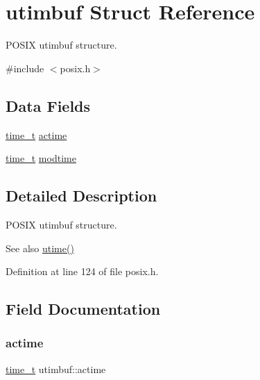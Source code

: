 \hypertarget{structutimbuf}{}\section{utimbuf Struct Reference}
\label{structutimbuf}


P\+O\+S\+IX utimbuf structure.  




{\ttfamily \#include $<$posix.\+h$>$}

\subsection*{Data Fields}
\begin{DoxyCompactItemize}
\item 
\hyperlink{time_8h_a3346b04b0420b32ccf6b706551b70762}{time\+\_\+t} \hyperlink{structutimbuf_aa39cf0bad7eff4df6239528506a557df}{actime}
\item 
\hyperlink{time_8h_a3346b04b0420b32ccf6b706551b70762}{time\+\_\+t} \hyperlink{structutimbuf_a7588ffe699a9eda52e94aa593bf7d6d8}{modtime}
\end{DoxyCompactItemize}


\subsection{Detailed Description}
P\+O\+S\+IX utimbuf structure. 

\begin{DoxySeeAlso}{See also}
\hyperlink{posix_8c_a732642e09075838bbbca28b3529f13db}{utime()} 
\end{DoxySeeAlso}


Definition at line 124 of file posix.\+h.



\subsection{Field Documentation}
\mbox{\label{structutimbuf_aa39cf0bad7eff4df6239528506a557df}} 
\subsubsection{\texorpdfstring{actime}{actime}}
{\footnotesize\ttfamily \hyperlink{time_8h_a3346b04b0420b32ccf6b706551b70762}{time\+\_\+t} utimbuf\+::actime}



